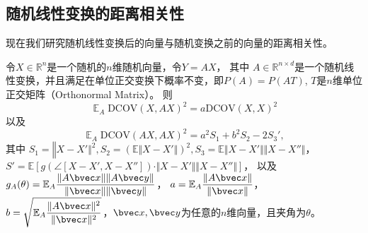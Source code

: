 \subsection{随机线性变换的距离相关性}
现在我们研究随机线性变换后的向量与随机变换之前的向量的距离相关性。
\begin{theorem}
\label{thm:ss-perm:linear-dcov}
    令$X\in \mathbb R^n$是一个随机的$n$维随机向量，令$Y = AX$，
    其中 $A \in \mathbb R^{n \times d}$是一个随机线性变换，并且满足在单位正交变换下概率不变，即$P(A) = P(AT)$, $T$是$n$维单位正交矩阵（Orthonormal Matrix）。
    则
    \begin{equation}
    \label{eq:ss-perm:linear-dcov1}
            \mathop{\mathbb E}_A \text{DCOV}(X, AX)^2 = a\text{DCOV}(X, X)^2
    \end{equation}
    以及    
    \begin{equation}
    \label{eq:ss-perm:linear-dcov2}
        \mathop{\mathbb E}_A \text{DCOV}(AX, AX)^2 = {a^2S_1 + b^2S_2 - 2S_3'},
    \end{equation}
    其中 $S_1 = \mathbb \Vert X - X'\Vert^2, S_2 = \left( \mathbb E \Vert X - X'\Vert \right)^2, S_3 = \mathbb E \Vert X - X' \Vert \Vert X - X'' \Vert$，\\
    $S' = \mathbb E \left[ g(\angle [X - X', X - X'']) \cdot \Vert X - X'\Vert \Vert X - X'' \Vert \right]$，
    以及
    $g_A(\theta) = \mathbb E_A \dfrac{\Vert A\bvec x \Vert \Vert A\bvec y \Vert}{\Vert \bvec x \Vert \Vert \bvec y \Vert} $，
    $a = \mathbb E_A \dfrac{\Vert A\bvec x \Vert}{\Vert \bvec x \Vert}$，
    $b = \sqrt{\mathbb E_A \dfrac{\Vert A\bvec x \Vert^2}{\Vert \bvec x \Vert^2}}$，$\bvec x, \bvec y$为任意的$n$维向量，且夹角为$\theta$。
\end{theorem}
